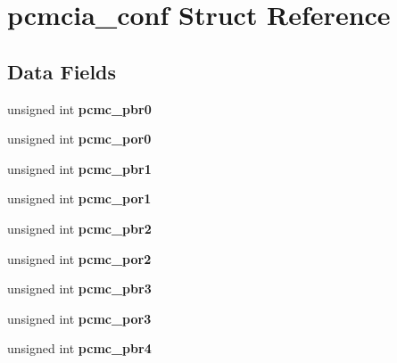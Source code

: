 \hypertarget{structpcmcia__conf}{}\section{pcmcia\+\_\+conf Struct Reference}
\label{structpcmcia__conf}
\subsection*{Data Fields}
\begin{DoxyCompactItemize}
\item 
\mbox{\label{structpcmcia__conf_a41fa6b2a227ffe689b8e72dcd81e0313}} 
unsigned int {\bfseries pcmc\+\_\+pbr0}
\item 
\mbox{\label{structpcmcia__conf_af434c0c507fe5768ddb75c1cc2b5355b}} 
unsigned int {\bfseries pcmc\+\_\+por0}
\item 
\mbox{\label{structpcmcia__conf_ae4dd0838a8828d7a200c11cb9a0de6d4}} 
unsigned int {\bfseries pcmc\+\_\+pbr1}
\item 
\mbox{\label{structpcmcia__conf_add44a2dd80fbe91909b60df4ce87c2c7}} 
unsigned int {\bfseries pcmc\+\_\+por1}
\item 
\mbox{\label{structpcmcia__conf_a4bcf4072726150d931876d2aab642275}} 
unsigned int {\bfseries pcmc\+\_\+pbr2}
\item 
\mbox{\label{structpcmcia__conf_a77ca2982a1d16fe379770bdd2cdb5420}} 
unsigned int {\bfseries pcmc\+\_\+por2}
\item 
\mbox{\label{structpcmcia__conf_a71cfaed377aa41983afd3e3ac7df4b5a}} 
unsigned int {\bfseries pcmc\+\_\+pbr3}
\item 
\mbox{\label{structpcmcia__conf_aeb90da5e7afcafa626d6356f19c8f998}} 
unsigned int {\bfseries pcmc\+\_\+por3}
\item 
\mbox{\label{structpcmcia__conf_a1be33e0a6452e0b4567e885b0c260086}} 
unsigned int {\bfseries pcmc\+\_\+pbr4}
\item 
\mbox{\label{structpcmcia__conf_a9970dacd1ca3ab9a041f59c35da4c0c7}} 

\end{DoxyCompactItemize}
